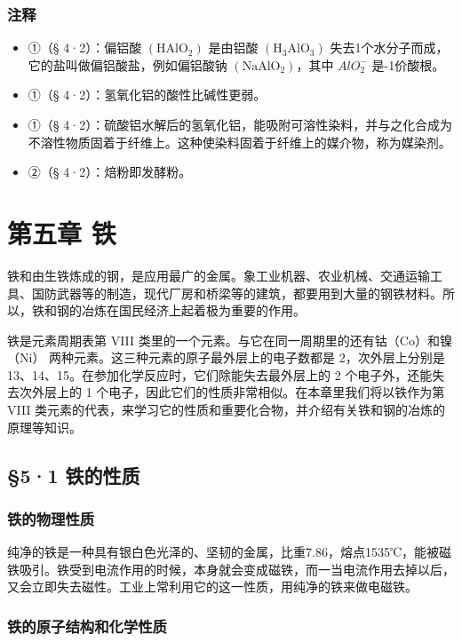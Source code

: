 \subsection{注释}

\begin{itemize}
\item
  ①（§ 4·2）：偏铝酸 \(\left(\mathrm{HAlO}_{2}\right)\) 是由铝酸
  \(\left(\mathrm{H}_{3}\mathrm{AlO}_{3}\right)\)
  失去1个水分子而成，它的盐叫做偏铝酸盐，例如偏铝酸钠
  \(\left(\mathrm{NaAlO}_{2}\right)\)，其中 \(AlO_{2}^{-}\) 是-1价酸根。
\item
  ①（§ 4·2）：氢氧化铝的酸性比碱性更弱。
\item
  ①（§
  4·2）：硫酸铝水解后的氢氧化铝，能吸附可溶性染料，并与之化合成为不溶性物质固着于纤维上。这种使染料固着于纤维上的媒介物，称为媒染剂。
\item
  ②（§ 4·2）：焙粉即发酵粉。
\end{itemize}

\chapter{第五章 铁}

铁和由生铁炼成的钢，是应用最广的金属。象工业机器、农业机械、交通运输工具、国防武器等的制造，现代厂房和桥梁等的建筑，都要用到大量的钢铁材料。所以，铁和钢的冶炼在国民经济上起着极为重要的作用。

铁是元素周期表第 VIII
类里的一个元素。与它在同一周期里的还有钴（Co）和镍（Ni）
两种元素。这三种元素的原子最外层上的电子数都是 2，次外层上分别是
13、14、15。在参加化学反应时，它们除能失去最外层上的 2
个电子外，还能失去次外层上的 1
个电子，因此它们的性质非常相似。在本章里我们将以铁作为第 VIII
类元素的代表，来学习它的性质和重要化合物，并介绍有关铁和钢的冶炼的原理等知识。

\section{§5·1 铁的性质}

\subsection{铁的物理性质}

纯净的铁是一种具有银白色光泽的、坚韧的金属，比重7.86，熔点1535℃，能被磁铁吸引。铁受到电流作用的时候，本身就会变成磁铁，而一当电流作用去掉以后，又会立即失去磁性。工业上常利用它的这一性质，用纯净的铁来做电磁铁。

\subsection{铁的原子结构和化学性质}


